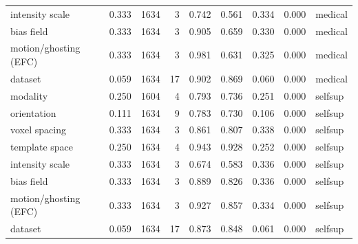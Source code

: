 \begin{tabular}{lrrrrrrrl}
intensity scale & 0.333 & 1634 & 3 & 0.742 & 0.561 & 0.334 & 0.000 & medical \\
bias field & 0.333 & 1634 & 3 & 0.905 & 0.659 & 0.330 & 0.000 & medical \\
motion/ghosting (EFC) & 0.333 & 1634 & 3 & 0.981 & 0.631 & 0.325 & 0.000 & medical \\
dataset & 0.059 & 1634 & 17 & 0.902 & 0.869 & 0.060 & 0.000 & medical \\
modality & 0.250 & 1604 & 4 & 0.793 & 0.736 & 0.251 & 0.000 & selfsup \\
orientation & 0.111 & 1634 & 9 & 0.783 & 0.730 & 0.106 & 0.000 & selfsup \\
voxel spacing & 0.333 & 1634 & 3 & 0.861 & 0.807 & 0.338 & 0.000 & selfsup \\
template space & 0.250 & 1634 & 4 & 0.943 & 0.928 & 0.252 & 0.000 & selfsup \\
intensity scale & 0.333 & 1634 & 3 & 0.674 & 0.583 & 0.336 & 0.000 & selfsup \\
bias field & 0.333 & 1634 & 3 & 0.889 & 0.826 & 0.336 & 0.000 & selfsup \\
motion/ghosting (EFC) & 0.333 & 1634 & 3 & 0.927 & 0.857 & 0.334 & 0.000 & selfsup \\
dataset & 0.059 & 1634 & 17 & 0.873 & 0.848 & 0.061 & 0.000 & selfsup \\
\bottomrule
\end{tabular}
